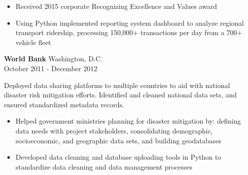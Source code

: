 \documentclass[letterpaper]{article}
\begin{document}

\vspace{-1mm}
\begin{itemize} \itemsep 0pt
    \item Received 2015 corporate Recognizing Excellence and Values award 

    \item Using Python implemented reporting system dashboard to analyze
    regional transport ridership, processing 150,000+ transactions per day from
    a 700+ vehicle fleet
    
\end{itemize}


\textbf{World Bank} 
    \hfill Washington, D.C.\\
    \hfill October 2011 - December 2012\\
\vspace{1mm}

Deployed  data sharing platforms to multiple countries to
aid with national disaster risk mitigation efforts. Identified and cleaned
national data sets, and ensured standardized metadata records.

\vspace{-1mm}
\begin{itemize} \itemsep 0pt
    \item Helped government ministries planning for disaster mitigation by:
    defining data needs with project stakeholders, consolidating demographic,
    socioeconomic, and geographic data sets, and building 
    geodatabases
    
    \item Developed data cleaning and database uploading tools in Python to 
    standardize data cleaning and data management processes
\end{itemize}
\end{document}
